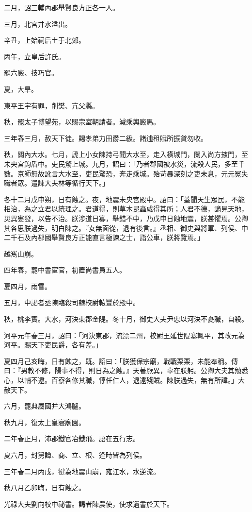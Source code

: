 \begin{pinyinscope}
二月，詔三輔內郡舉賢良方正各一人。

三月，北宮井水溢出。

辛丑，上始祠后土于北郊。

丙午，立皇后許氏。

罷六廄、技巧官。

夏，大旱。

東平王宇有罪，削樊、亢父縣。

秋，罷太子博望苑，以賜宗室朝請者。減乘輿廄馬。

三年春三月，赦天下徒。賜孝弟力田爵二級。諸逋租賦所振貸勿收。

秋，關內大水。七月，虒上小女陳持弓聞大水至，走入橫城門，闌入尚方掖門，至未央宮鉤盾中。吏民驚上城。九月，詔曰：「乃者郡國被水災，流殺人民，多至千數。京師無故訛言大水至，吏民驚恐，奔走乘城。殆苛暴深刻之吏未息，元元冤失職者眾。遣諫大夫林等循行天下。」

冬十二月戊申朔，日有蝕之。夜，地震未央宮殿中。詔曰：「蓋聞天生眾民，不能相治，為之立君以統理之。君道得，則草木昆蟲咸得其所；人君不德，謫見天地，災異婁發，以告不治。朕涉道日寡，舉錯不中，乃戊申日蝕地震，朕甚懼焉。公卿其各思朕過失，明白陳之。『女無面從，退有後言。』丞相、御史與將軍、列侯、中二千石及內郡國舉賢良方正能直言極諫之士，詣公車，朕將覽焉。」

越嶲山崩。

四年春，罷中書宦官，初置尚書員五人。

夏四月，雨雪。

五月，中謁者丞陳臨殺司隸校尉轅豐於殿中。

秋，桃李實。大水，河決東郡金隄。冬十月，御史大夫尹忠以河決不憂職，自殺。

河平元年春三月，詔曰：「河決東郡，流漂二州，校尉王延世隄塞輒平，其改元為河平。賜天下吏民爵，各有差。」

夏四月己亥晦，日有蝕之，既。詔曰：「朕獲保宗廟，戰戰栗栗，未能奉稱。傳曰：『男教不修，陽事不得，則日為之蝕。』天著厥異，辜在朕躬。公卿大夫其勉悉心，以輔不逮。百寮各修其職，惇任仁人，退遠殘賊。陳朕過失，無有所諱。」大赦天下。

六月，罷典屬國并大鴻臚。

秋九月，復太上皇寢廟園。

二年春正月，沛郡鐵官冶鐵飛。語在五行志。

夏六月，封舅譚、商、立、根、逢時皆為列侯。

三年春二月丙戌，犍為地震山崩，雍江水，水逆流。

秋八月乙卯晦，日有蝕之。

光祿大夫劉向校中祕書。謁者陳農使，使求遺書於天下。


\end{pinyinscope}
